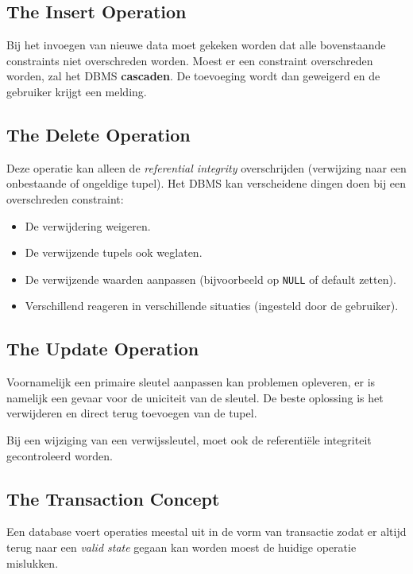 \subsection{The Insert Operation}
Bij het invoegen van nieuwe data moet gekeken worden dat alle bovenstaande constraints niet overschreden worden. Moest er een constraint overschreden worden, zal het DBMS \textbf{cascaden}. De toevoeging wordt dan geweigerd en de gebruiker krijgt een melding.

\subsection{The Delete Operation}
Deze operatie kan alleen de \textit{referential integrity} overschrijden (verwijzing naar een onbestaande of ongeldige tupel). Het DBMS kan verscheidene dingen doen bij een overschreden constraint:
\begin{itemize}
	\item De verwijdering weigeren.
	\item De verwijzende tupels ook weglaten.
	\item De verwijzende waarden aanpassen (bijvoorbeeld op \texttt{NULL} of default zetten).
	\item Verschillend reageren in verschillende situaties (ingesteld door de gebruiker).
\end{itemize}

\subsection{The Update Operation}
Voornamelijk een primaire sleutel aanpassen kan problemen opleveren, er is namelijk een gevaar voor de uniciteit van de sleutel. De beste oplossing is het verwijderen en direct terug toevoegen van de tupel.

Bij een wijziging van een verwijssleutel, moet ook de referenti\"ele integriteit gecontroleerd worden.

\subsection{The Transaction Concept}
Een database voert operaties meestal uit in de vorm van transactie zodat er altijd terug naar een \textit{valid state} gegaan kan worden moest de huidige operatie mislukken.
